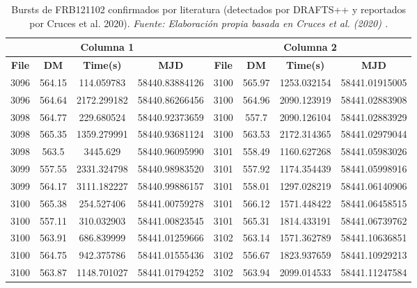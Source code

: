 \begin{table}[H]
    \centering
    \caption{Bursts de FRB121102 confirmados por literatura (detectados por DRAFTS++ y reportados por Cruces et al. 2020). \textit{Fuente: Elaboración propia basada en Cruces et al. (2020) \cite{cruces2020frb121102}.}}
    \label{tab:confirmed_bursts}
    \begin{tabular}{|c|c|c|c|c|c|c|c|}
        \hline
        \multicolumn{4}{|c|}{\textbf{Columna 1}} & \multicolumn{4}{|c|}{\textbf{Columna 2}} \\
        \hline
        \textbf{File} & \textbf{DM} & \textbf{Time(s)} & \textbf{MJD} & \textbf{File} & \textbf{DM} & \textbf{Time(s)} & \textbf{MJD} \\
        \hline
        3096 & 564.15 & 114.059783 & 58440.83884126 & 3100 & 565.97 & 1253.032154 & 58441.01915005 \\
        3096 & 564.64 & 2172.299182 & 58440.86266456 & 3100 & 564.96 & 2090.123919 & 58441.02883908 \\
        3098 & 564.77 & 229.680524 & 58440.92373659 & 3100 & 557.7 & 2090.126104 & 58441.02883929 \\
        3098 & 565.35 & 1359.279991 & 58440.93681124 & 3100 & 563.53 & 2172.314365 & 58441.02979044 \\
        3098 & 563.5 & 3445.629 & 58440.96095990 & 3101 & 558.49 & 1160.627268 & 58441.05983026 \\
        3099 & 557.55 & 2331.324798 & 58440.98983520 & 3101 & 557.92 & 1174.354439 & 58441.05998916 \\
        3099 & 564.17 & 3111.182227 & 58440.99886157 & 3101 & 558.01 & 1297.028219 & 58441.06140906 \\
        3100 & 565.38 & 254.527406 & 58441.00759278 & 3101 & 566.12 & 1571.448422 & 58441.06458515 \\
        3100 & 557.11 & 310.032903 & 58441.00823545 & 3101 & 565.31 & 1814.433191 & 58441.06739762 \\
        3100 & 563.91 & 686.839999 & 58441.01259666 & 3102 & 563.14 & 1571.362789 & 58441.10636851 \\
        3100 & 564.75 & 942.375786 & 58441.01555436 & 3102 & 556.67 & 1823.937659 & 58441.10929213 \\
        3100 & 563.87 & 1148.701027 & 58441.01794252 & 3102 & 563.94 & 2099.014533 & 58441.11247584 \\
        \hline
    \end{tabular}
\end{table}


